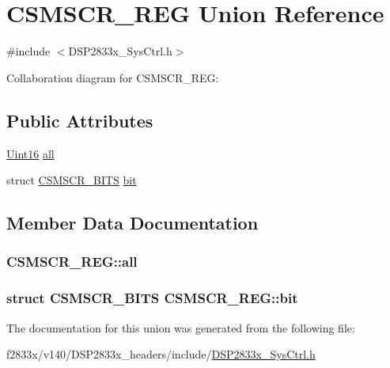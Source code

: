 \hypertarget{union_c_s_m_s_c_r___r_e_g}{}\section{C\+S\+M\+S\+C\+R\+\_\+\+R\+E\+G Union Reference}
\label{union_c_s_m_s_c_r___r_e_g}


{\ttfamily \#include $<$D\+S\+P2833x\+\_\+\+Sys\+Ctrl.\+h$>$}



Collaboration diagram for C\+S\+M\+S\+C\+R\+\_\+\+R\+E\+G\+:
\subsection*{Public Attributes}
\begin{DoxyCompactItemize}
\item 
\hyperlink{_d_s_p2833x___device_8h_a59a9f6be4562c327cbfb4f7e8e18f08b}{Uint16} \hyperlink{union_c_s_m_s_c_r___r_e_g_a8cae8c039202b2507d03cab325844976}{all}
\item 
struct \hyperlink{struct_c_s_m_s_c_r___b_i_t_s}{C\+S\+M\+S\+C\+R\+\_\+\+B\+I\+T\+S} \hyperlink{union_c_s_m_s_c_r___r_e_g_afc38165358ce48cfba84877599c29bb3}{bit}
\end{DoxyCompactItemize}


\subsection{Member Data Documentation}
\hypertarget{union_c_s_m_s_c_r___r_e_g_a8cae8c039202b2507d03cab325844976}{}
\subsubsection[{all}]{ C\+S\+M\+S\+C\+R\+\_\+\+R\+E\+G\+::all}\label{union_c_s_m_s_c_r___r_e_g_a8cae8c039202b2507d03cab325844976}
\hypertarget{union_c_s_m_s_c_r___r_e_g_afc38165358ce48cfba84877599c29bb3}{}
\subsubsection[{bit}]{\setlength{\rightskip}{0pt plus 5cm}struct {\bf C\+S\+M\+S\+C\+R\+\_\+\+B\+I\+T\+S} C\+S\+M\+S\+C\+R\+\_\+\+R\+E\+G\+::bit}\label{union_c_s_m_s_c_r___r_e_g_afc38165358ce48cfba84877599c29bb3}


The documentation for this union was generated from the following file\+:\begin{DoxyCompactItemize}
\item 
f2833x/v140/\+D\+S\+P2833x\+\_\+headers/include/\hyperlink{_d_s_p2833x___sys_ctrl_8h}{D\+S\+P2833x\+\_\+\+Sys\+Ctrl.\+h}\end{DoxyCompactItemize}
